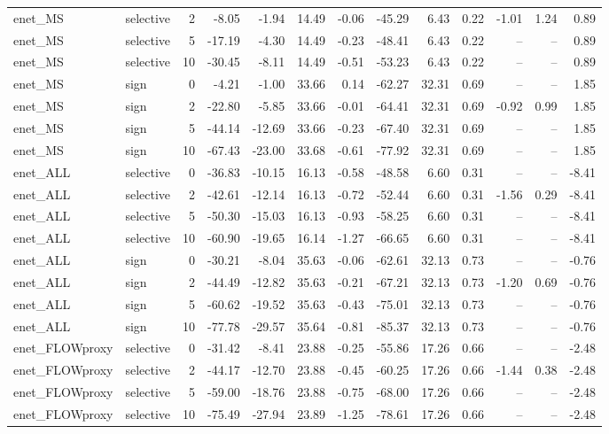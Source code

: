 \begin{tabular}{llrrrrrrrrrrr}
enet_MS & selective & 2 & -8.05 & -1.94 & 14.49 & -0.06 & -45.29 & 6.43 & 0.22 & -1.01 & 1.24 & 0.89 \\
enet_MS & selective & 5 & -17.19 & -4.30 & 14.49 & -0.23 & -48.41 & 6.43 & 0.22 & -- & -- & 0.89 \\
enet_MS & selective & 10 & -30.45 & -8.11 & 14.49 & -0.51 & -53.23 & 6.43 & 0.22 & -- & -- & 0.89 \\
enet_MS & sign & 0 & -4.21 & -1.00 & 33.66 & 0.14 & -62.27 & 32.31 & 0.69 & -- & -- & 1.85 \\
enet_MS & sign & 2 & -22.80 & -5.85 & 33.66 & -0.01 & -64.41 & 32.31 & 0.69 & -0.92 & 0.99 & 1.85 \\
enet_MS & sign & 5 & -44.14 & -12.69 & 33.66 & -0.23 & -67.40 & 32.31 & 0.69 & -- & -- & 1.85 \\
enet_MS & sign & 10 & -67.43 & -23.00 & 33.68 & -0.61 & -77.92 & 32.31 & 0.69 & -- & -- & 1.85 \\
enet_ALL & selective & 0 & -36.83 & -10.15 & 16.13 & -0.58 & -48.58 & 6.60 & 0.31 & -- & -- & -8.41 \\
enet_ALL & selective & 2 & -42.61 & -12.14 & 16.13 & -0.72 & -52.44 & 6.60 & 0.31 & -1.56 & 0.29 & -8.41 \\
enet_ALL & selective & 5 & -50.30 & -15.03 & 16.13 & -0.93 & -58.25 & 6.60 & 0.31 & -- & -- & -8.41 \\
enet_ALL & selective & 10 & -60.90 & -19.65 & 16.14 & -1.27 & -66.65 & 6.60 & 0.31 & -- & -- & -8.41 \\
enet_ALL & sign & 0 & -30.21 & -8.04 & 35.63 & -0.06 & -62.61 & 32.13 & 0.73 & -- & -- & -0.76 \\
enet_ALL & sign & 2 & -44.49 & -12.82 & 35.63 & -0.21 & -67.21 & 32.13 & 0.73 & -1.20 & 0.69 & -0.76 \\
enet_ALL & sign & 5 & -60.62 & -19.52 & 35.63 & -0.43 & -75.01 & 32.13 & 0.73 & -- & -- & -0.76 \\
enet_ALL & sign & 10 & -77.78 & -29.57 & 35.64 & -0.81 & -85.37 & 32.13 & 0.73 & -- & -- & -0.76 \\
enet_FLOWproxy & selective & 0 & -31.42 & -8.41 & 23.88 & -0.25 & -55.86 & 17.26 & 0.66 & -- & -- & -2.48 \\
enet_FLOWproxy & selective & 2 & -44.17 & -12.70 & 23.88 & -0.45 & -60.25 & 17.26 & 0.66 & -1.44 & 0.38 & -2.48 \\
enet_FLOWproxy & selective & 5 & -59.00 & -18.76 & 23.88 & -0.75 & -68.00 & 17.26 & 0.66 & -- & -- & -2.48 \\
enet_FLOWproxy & selective & 10 & -75.49 & -27.94 & 23.89 & -1.25 & -78.61 & 17.26 & 0.66 & -- & -- & -2.48 \\

\end{tabular}

